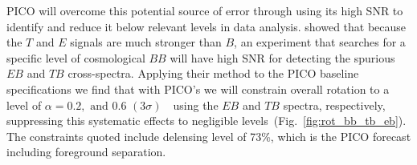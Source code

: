 \documentclass[PICOReport.tex]{subfiles}
\begin{document}
PICO will overcome this potential source of error through using its high \ac{SNR} to identify and reduce it below relevant levels in data analysis. \citet{yadav} showed that because the $T$ and $E$ signals are much stronger than $B$, an experiment that searches for a specific level of cosmological $BB$ will have high \ac{SNR} for detecting the spurious $EB$ and $TB$ cross-spectra. Applying their method to the PICO baseline specifications we find that with PICO's we will constrain overall rotation to a level of $\alpha=0.2, \,\, \mbox{and}\,\, 0.6 \,\, (3\sigma)$~\arcmin\ using the $EB$ and $TB$ spectra, respectively, suppressing this systematic effects to negligible levels~(Fig.~\ref{fig:rot_bb_tb_eb}). The constraints quoted include delensing level of 73\%, which is the PICO forecast including foreground separation. 






\end{document}
